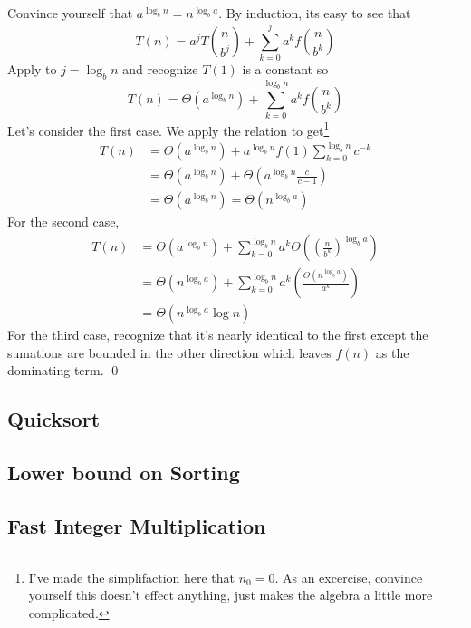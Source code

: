 \documentclass[11pt]{article}
\theoremstyle{plain}
\theoremstyle{definition}
\numberwithin{equation}{section}
\numberwithin{figure}{section}
\begin{document}
\proof Convince yourself that $a^{\log_b n} = n^{\log_b a}$. By induction, its easy to see that 
\begin{equation}
T(n) = a^j T\left(\frac{n}{b^j}\right) + \sum_{k = 0}^j a^k f\left(\frac{n}{b^k}\right)
\end{equation}
Apply to $j = \log_b n$ and recognize $T(1)$ is a constant so
\begin{equation}
T(n) = \Theta(a^{\log_b n}) + \sum_{k = 0}^{\log_b n} a^k f\left(\frac{n}{b^k}\right)
\end{equation}
Let's consider the first case. We apply the relation to get\footnote{I've made the simplifaction here that $n_0 = 0$. As an excercise, convince yourself this doesn't effect anything, just makes the algebra a little more complicated.} 
\begin{equation}
\begin{aligned}
T(n) &= \Theta(a^{\log_b n}) + a^{\log_b n} f(1) \sum_{k = 0}^{\log_b n} c^{-k} \\
&= \Theta(a^{\log_b n}) + \Theta \left(a^{\log_b n} \frac{c}{c-1}\right) \\
&= \Theta(a^{\log_b n}) = \Theta(n^{\log_b a})
\end{aligned}
\end{equation}
For the second case,
\begin{equation}
\begin{aligned}
T(n) &= \Theta(a^{\log_b n}) + \sum_{k = 0}^{\log_b n} a^k \Theta \left( \left( \frac{n}{b^k} \right)^{\log_b a} \right) \\
&= \Theta(n^{\log_b a}) + \sum_{k = 0}^{\log_b n} a^k \left( \frac{\Theta(n^{\log_b a})}{a^k} \right) \\
&= \Theta(n^{\log_b a} \log n)
\end{aligned}
\end{equation}
For the third case, recognize that it's nearly identical to the first except the sumations are bounded in the other direction which leaves $f(n)$ as the dominating term. \qed

\subsection{Quicksort}

\subsection{Lower bound on Sorting}

\subsection{Fast Integer Multiplication}
\end{document}
